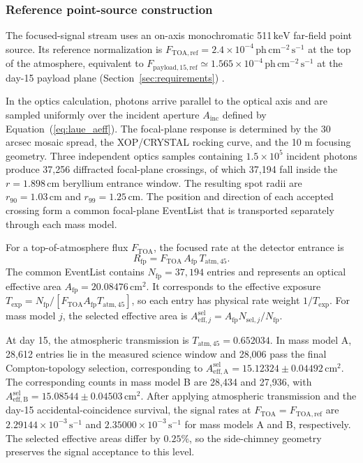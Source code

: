 \documentclass[11pt]{article}
\newcommand{\keV}{\ensuremath{\,\mathrm{keV}}}
\newcommand{\phcms}{\ensuremath{\,\mathrm{ph\,cm^{-2}\,s^{-1}}}}
\newcommand{\cps}{\ensuremath{\,\mathrm{s^{-1}}}}
\newcommand{\ftoaref}{F_{\mathrm{TOA,ref}}}
\newcommand{\fpayloadref}{F_{\mathrm{payload,15,ref}}}
\begin{document}
\FloatBarrier

\subsubsection{Reference point-source construction}
\label{subsec:pointsource}

The focused-signal stream uses an on-axis monochromatic 511\keV{} far-field
point source. Its reference normalization is $\ftoaref=2.4\times10^{-4}\phcms$
at the top of the atmosphere, equivalent to
$\fpayloadref\simeq1.565\times10^{-4}\phcms$ at the day-15 payload plane
(Section~\ref{sec:requirements}) \cite{DeCesare2011}.

In the optics calculation, photons arrive parallel to the optical axis and are
sampled uniformly over the incident aperture $A_{\mathrm{inc}}$ defined by
Equation~(\ref{eq:laue_aeff}). The focal-plane response is determined by the
30 arcsec mosaic spread, the XOP/CRYSTAL rocking curve, and the 10 m focusing
geometry. Three independent optics samples containing $1.5\times10^5$ incident
photons produce 37,256 diffracted focal-plane crossings, of which 37,194 fall
inside the $r=1.898\,\mathrm{cm}$ beryllium entrance window. The resulting spot
radii are $r_{90}=1.03\,\mathrm{cm}$ and $r_{99}=1.25\,\mathrm{cm}$. The position
and direction of each accepted crossing form a common focal-plane EventList that
is transported separately through each mass model.

For a top-of-atmosphere flux $F_{\mathrm{TOA}}$, the focused rate at the detector
entrance is
\begin{equation}
  R_{\mathrm{fp}}=F_{\mathrm{TOA}}\,A_{\mathrm{fp}}\,T_{\mathrm{atm},45}.
\end{equation}
The common EventList contains $N_{\mathrm{fp}}=37{,}194$ entries and represents
an optical effective area $A_{\mathrm{fp}}=20.08476\,\mathrm{cm^2}$. It
corresponds to the effective exposure
$T_{\mathrm{exp}}=N_{\mathrm{fp}}/[F_{\mathrm{TOA}}A_{\mathrm{fp}}
T_{\mathrm{atm},45}]$, so each entry has physical rate weight
$1/T_{\mathrm{exp}}$. For mass model $j$, the selected effective area is
$A_{\mathrm{eff},j}^{\mathrm{sel}}=A_{\mathrm{fp}}N_{\mathrm{sel},j}/N_{\mathrm{fp}}$.

At day 15, the atmospheric transmission is $T_{\mathrm{atm},45}=0.652034$. In
mass model A, 28,612 entries lie in the measured science window and 28,006 pass
the final Compton-topology selection, corresponding to
$A_{\mathrm{eff,A}}^{\mathrm{sel}}=15.12324\pm0.04492\,\mathrm{cm^2}$. The
corresponding counts in mass model B are 28,434 and 27,936, with
$A_{\mathrm{eff,B}}^{\mathrm{sel}}=15.08544\pm0.04503\,\mathrm{cm^2}$. After applying atmospheric
transmission and the day-15 accidental-coincidence survival, the signal rates at
$F_{\mathrm{TOA}}=\ftoaref$ are $2.29144\times10^{-3}\cps$ and
$2.35000\times10^{-3}\cps$ for mass models A and B, respectively. The selected
effective areas differ by $0.25\%$, so the side-chimney geometry preserves the
signal acceptance to this level.
\end{document}
